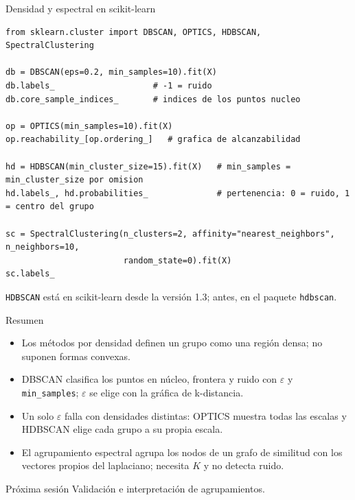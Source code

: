 \documentclass[aspectratio=169,11pt]{beamer}
\newcommand{\eps}{\varepsilon}
\begin{document}
\begin{frame}[fragile]{Densidad y espectral en scikit-learn}
\begin{lstlisting}
from sklearn.cluster import DBSCAN, OPTICS, HDBSCAN, SpectralClustering

db = DBSCAN(eps=0.2, min_samples=10).fit(X)
db.labels_                    # -1 = ruido
db.core_sample_indices_       # indices de los puntos nucleo

op = OPTICS(min_samples=10).fit(X)
op.reachability_[op.ordering_]   # grafica de alcanzabilidad

hd = HDBSCAN(min_cluster_size=15).fit(X)   # min_samples = min_cluster_size por omision
hd.labels_, hd.probabilities_              # pertenencia: 0 = ruido, 1 = centro del grupo

sc = SpectralClustering(n_clusters=2, affinity="nearest_neighbors", n_neighbors=10,
                        random_state=0).fit(X)
sc.labels_
\end{lstlisting}
  {\small \texttt{HDBSCAN} está en scikit-learn desde la versión 1.3; antes, en el paquete \texttt{hdbscan}.}
\end{frame}



\begin{frame}{Resumen}
  \begin{itemize}
    \item Los métodos por densidad definen un grupo como una región densa; no suponen formas convexas.
    \item DBSCAN clasifica los puntos en núcleo, frontera y ruido con $\eps$ y \texttt{min\_samples};
          $\eps$ se elige con la gráfica de k-distancia.
    \item Un solo $\eps$ falla con densidades distintas: OPTICS muestra todas las escalas y HDBSCAN
          elige cada grupo a su propia escala.
    \item El agrupamiento espectral agrupa los nodos de un grafo de similitud con los vectores propios
          del laplaciano; necesita $K$ y no detecta ruido.
  \end{itemize}
  \vspace{6pt}
  \begin{block}{Próxima sesión}
    Validación e interpretación de agrupamientos.
  \end{block}
\end{frame}
\end{document}
